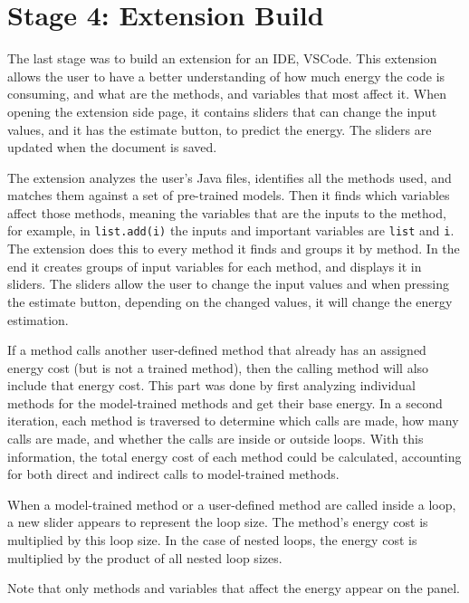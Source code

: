 \section{Stage 4: Extension Build} \label{sec:work_stage4_extension_build}

The last stage was to build an extension for an IDE, VSCode. This extension allows the user to have a better understanding of how much energy the code is consuming, and what are the methods, and variables that most affect it.
When opening the extension side page, it contains sliders that can change the input values, and it has the estimate button, to predict the energy.
The sliders are updated when the document is saved.%

The extension analyzes the user's Java files, identifies all the methods used, and matches them against a set of pre-trained models. Then it finds which variables affect those methods, meaning the variables that are the inputs to the method, for example, in \texttt{list.add(i)}  the inputs and important variables are \texttt{list} and \texttt{i}.
The extension does this to every method it finds and groups it by method. In the end it creates groups of input variables for each method, and displays it in sliders. The sliders allow the user to change the input values and when pressing the estimate button, depending on the changed values, it will change the energy estimation.

If a method calls another user-defined method that already has an assigned energy cost (but is not a trained method), then the calling method will also include that energy cost. This part was done by first analyzing individual methods for the model-trained methods and get their base energy. In a second iteration, each method is traversed to determine which calls are made, how many calls are made, and whether the calls are inside or outside loops. With this information, the total energy cost of each method could be calculated, accounting for both direct and indirect calls to model-trained methods.


When a model-trained method or a user-defined method are called inside a loop, a new slider appears to represent the loop size. The method’s energy cost is multiplied by this loop size. In the case of nested loops, the energy cost is multiplied by the product of all nested loop sizes.

Note that only methods and variables that affect the energy appear on the panel.

